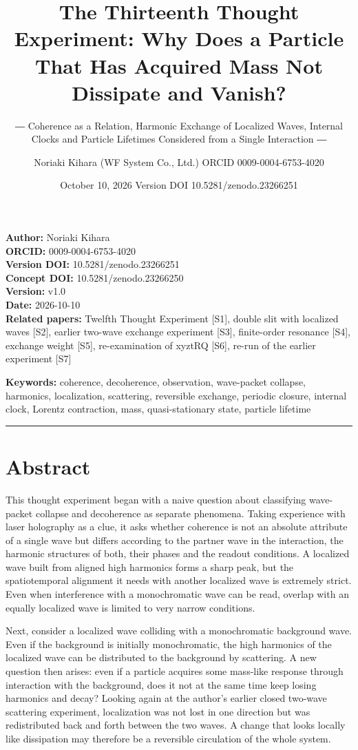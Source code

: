 \documentclass[
  a4paper,
]{article}
\title{The Thirteenth Thought Experiment: Why Does a Particle That Has
Acquired Mass Not Dissipate and Vanish?}
\subtitle{― Coherence as a Relation, Harmonic Exchange of Localized
Waves, Internal Clocks and Particle Lifetimes Considered from a Single
Interaction ―}
\author{Noriaki Kihara (WF System Co., Ltd.) ORCID 0009-0004-6753-4020}
\date{October 10, 2026 Version DOI 10.5281/zenodo.23266251}
\begin{document}
\maketitle

\textbf{Author:} Noriaki Kihara\\
\textbf{ORCID:} 0009-0004-6753-4020\\
\textbf{Version DOI:} 10.5281/zenodo.23266251\\
\textbf{Concept DOI:} 10.5281/zenodo.23266250\\
\textbf{Version:} v1.0\\
\textbf{Date:} 2026-10-10\\
\textbf{Related papers:} Twelfth Thought Experiment {[}S1{]}, double
slit with localized waves {[}S2{]}, earlier two-wave exchange experiment
{[}S3{]}, finite-order resonance {[}S4{]}, exchange weight {[}S5{]},
re-examination of xyztRQ {[}S6{]}, re-run of the earlier experiment
{[}S7{]}

\textbf{Keywords:} coherence, decoherence, observation, wave-packet
collapse, harmonics, localization, scattering, reversible exchange,
periodic closure, internal clock, Lorentz contraction, mass,
quasi-stationary state, particle lifetime

\begin{center}\rule{0.5\linewidth}{0.5pt}\end{center}

\section{Abstract}\label{abstract}

This thought experiment began with a naive question about classifying
wave-packet collapse and decoherence as separate phenomena. Taking
experience with laser holography as a clue, it asks whether coherence is
not an absolute attribute of a single wave but differs according to the
partner wave in the interaction, the harmonic structures of both, their
phases and the readout conditions. A localized wave built from aligned
high harmonics forms a sharp peak, but the spatiotemporal alignment it
needs with another localized wave is extremely strict. Even when
interference with a monochromatic wave can be read, overlap with an
equally localized wave is limited to very narrow conditions.

Next, consider a localized wave colliding with a monochromatic
background wave. Even if the background is initially monochromatic, the
high harmonics of the localized wave can be distributed to the
background by scattering. A new question then arises: even if a particle
acquires some mass-like response through interaction with the
background, does it not at the same time keep losing harmonics and
decay? Looking again at the author's earlier closed two-wave scattering
experiment, localization was not lost in one direction but was
redistributed back and forth between the two waves. A change that looks
locally like dissipation may therefore be a reversible circulation of
the whole system.
\end{document}
